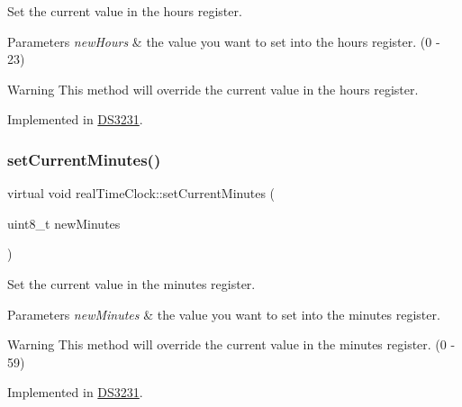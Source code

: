 Set the current value in the hours register. 


\begin{DoxyParams}{Parameters}
{\em new\+Hours} & the value you want to set into the hours register. (0 -\/ 23) \\
\hline
\end{DoxyParams}
\begin{DoxyWarning}{Warning}
This method will override the current value in the hours register. 
\end{DoxyWarning}


Implemented in \mbox{\hyperlink{class_d_s3231_ae59c15abcccd8e27eadebcd150db810e}{D\+S3231}}.

\mbox{\label{classreal_time_clock_a52da7366cd5f1e4c270eb87e7298da42}} 
\subsubsection{\texorpdfstring{set\+Current\+Minutes()}{setCurrentMinutes()}}
{\footnotesize\ttfamily virtual void real\+Time\+Clock\+::set\+Current\+Minutes (\begin{DoxyParamCaption}\item[{uint8\+\_\+t}]{new\+Minutes }\end{DoxyParamCaption})\hspace{0.3cm}{\ttfamily [pure virtual]}}



Set the current value in the minutes register. 


\begin{DoxyParams}{Parameters}
{\em new\+Minutes} & the value you want to set into the minutes register. \\
\hline
\end{DoxyParams}
\begin{DoxyWarning}{Warning}
This method will override the current value in the minutes register. (0 -\/ 59) 
\end{DoxyWarning}


Implemented in \mbox{\hyperlink{class_d_s3231_a221f92091b813108b3515f6676be29c8}{D\+S3231}}.

\mbox{\label{classreal_time_clock_a2edeb084630a78309bc574eceaf5d6ae}} 
